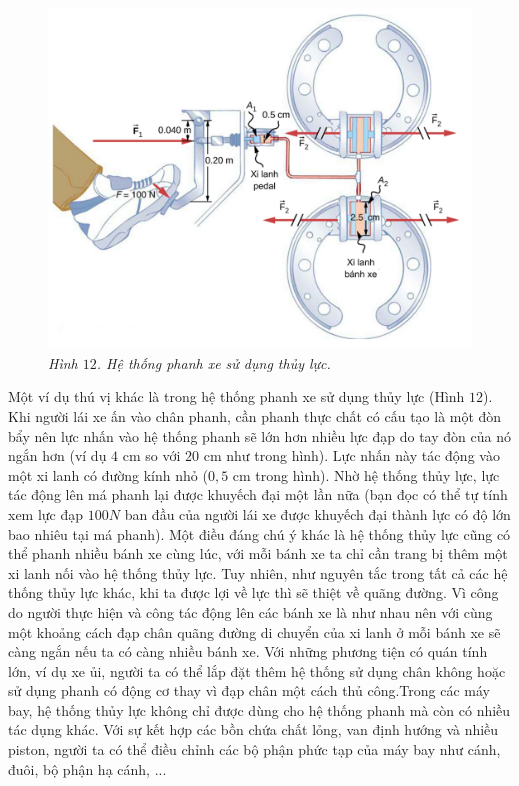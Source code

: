 \begin{multicols}{2}
\begin{figure}[H]
		\includegraphics[width= 1\linewidth]{23}
		\caption{\small\textit{\color{timhieukhoahoc}Hình $12$. Hệ thống phanh xe sử dụng thủy lực.}}
		\vspace*{-10pt}
	\end{figure}
	Một ví dụ thú vị khác là trong hệ thống phanh xe sử dụng thủy lực (Hình $12$). Khi người lái xe ấn vào chân phanh, cần phanh thực chất có cấu tạo là một đòn bẩy nên lực nhấn vào hệ thống phanh sẽ lớn hơn nhiều lực đạp do tay đòn của nó ngắn hơn (ví dụ $4$ cm so với $20$ cm như trong hình). Lực nhấn này tác động vào một xi lanh có đường kính nhỏ ($0,5$ cm trong hình). Nhờ hệ thống thủy lực, lực tác động lên má phanh lại được khuyếch đại một lần nữa (bạn đọc có thể tự tính xem lực đạp $100N$ ban đầu của người lái xe được khuyếch đại thành lực có độ lớn bao nhiêu tại má phanh). Một điều đáng chú ý khác là hệ thống thủy lực cũng có thể phanh nhiều bánh xe cùng lúc, với mỗi bánh xe ta chỉ cần trang bị thêm một xi lanh nối vào hệ thống thủy lực. Tuy nhiên, như nguyên tắc trong tất cả các hệ thống thủy lực khác, khi ta được lợi về lực thì sẽ thiệt về quãng đường. Vì công do người thực hiện và công tác động lên các bánh xe là như nhau nên với cùng một khoảng cách đạp chân quãng đường di chuyển của xi lanh ở mỗi bánh xe sẽ càng ngắn nếu ta có càng nhiều bánh xe. 
	\vskip 0.1cm
	Với những phương tiện có quán tính lớn, ví dụ xe ủi, người ta có thể lắp đặt thêm hệ thống sử dụng chân không hoặc sử dụng phanh có động cơ thay vì đạp chân một cách thủ công.Trong các máy bay, hệ thống thủy lực không chỉ được dùng cho hệ thống phanh mà còn có nhiều tác dụng khác. Với sự kết hợp các bồn chứa chất lỏng, van định hướng và nhiều piston, người ta có thể điều chỉnh các bộ phận phức tạp của máy bay như cánh, đuôi, bộ phận hạ cánh, ...

\end{multicols}
